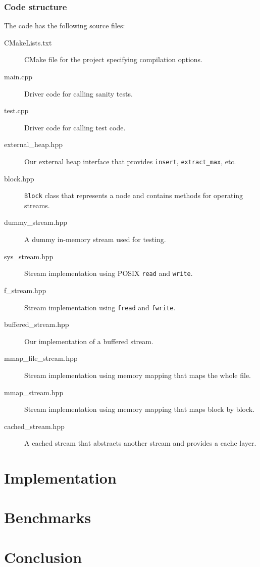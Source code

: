 \documentclass[a4paper,12pt]{article}
\begin{document}
\subsubsection{Code structure}
The code has the following source files:
\begin{description}
\item[CMakeLists.txt] CMake file for the project specifying
  compilation options.

\item[main.cpp] Driver code for calling sanity tests.

\item[test.cpp] Driver code for calling test code.

\item[external\_heap.hpp] Our external heap interface that provides \texttt{insert}, \texttt{extract\_max}, etc.

\item[block.hpp] \texttt{Block} class that represents a node and contains methods for operating streams.

\item[dummy\_stream.hpp] A dummy in-memory stream used for testing.

\item[sys\_stream.hpp] Stream implementation using POSIX \texttt{read} and \texttt{write}.

\item[f\_stream.hpp] Stream implementation using \texttt{fread} and \texttt{fwrite}.

\item[buffered\_stream.hpp] Our implementation of a buffered stream.

\item[mmap\_file\_stream.hpp] Stream implementation using memory mapping that maps the whole file.

\item[mmap\_stream.hpp] Stream implementation using memory mapping that maps block by block.

\item[cached\_stream.hpp] A cached stream that abstracts another stream and provides a cache layer.
\end{description}

\clearpage
\section{Implementation}


\section{Benchmarks}


\section{Conclusion}



\end{document}
